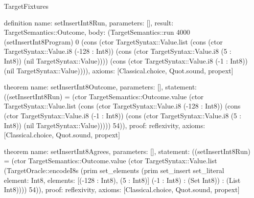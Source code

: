 \begin{lexlean}{TargetFixtures}
\begin{semanticmodule}
definition{
  name: setInsertInt8Run,
  parameters: [],
  result: TargetSemantics::Outcome,
  body: (TargetSemantics::run 4000 (setInsertInt8Program) 0 (cons (ctor TargetSyntax::Value.list (cons (ctor TargetSyntax::Value.i8 (-128 : Int8)) (cons (ctor TargetSyntax::Value.i8 (5 : Int8)) (nil TargetSyntax::Value)))) (cons (ctor TargetSyntax::Value.i8 (-1 : Int8)) (nil TargetSyntax::Value)))),
  axioms: [Classical.choice, Quot.sound, propext]
}

theorem{
  name: setInsertInt8Outcome,
  parameters: [],
  statement: ((setInsertInt8Run) = (ctor TargetSemantics::Outcome.value (ctor TargetSyntax::Value.list (cons (ctor TargetSyntax::Value.i8 (-128 : Int8)) (cons (ctor TargetSyntax::Value.i8 (-1 : Int8)) (cons (ctor TargetSyntax::Value.i8 (5 : Int8)) (nil TargetSyntax::Value))))) 54)),
  proof: reflexivity{},
  axioms: [Classical.choice, Quot.sound, propext]
}

theorem{
  name: setInsertInt8Agrees,
  parameters: [],
  statement: ((setInsertInt8Run) = (ctor TargetSemantics::Outcome.value (ctor TargetSyntax::Value.list (TargetOracle::encodeI8s (prim set_elements (prim set_insert set_literal{
    element: Int8,
    elements: [(-128 : Int8), (5 : Int8)]
  } (-1 : Int8) : (Set Int8)) : (List Int8)))) 54)),
  proof: reflexivity{},
  axioms: [Classical.choice, Quot.sound, propext]
}


\end{semanticmodule}
\end{lexlean}
